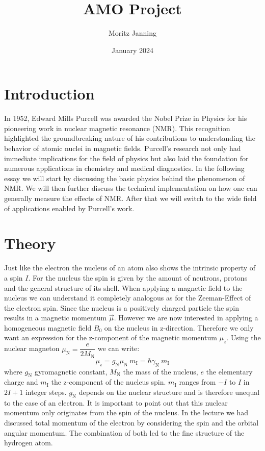 \documentclass{article}
\title{AMO Project}
\author{Moritz Janning}
\date{January 2024}
\begin{document}
\maketitle

\section{Introduction}

In 1952, Edward Mills Purcell was awarded the Nobel Prize in Physics for his pioneering work in nuclear magnetic resonance (NMR). This recognition highlighted the groundbreaking nature of his contributions to understanding the behavior of atomic nuclei in magnetic fields. Purcell's research not only had immediate implications for the field of physics but also laid the foundation for numerous applications in chemistry and medical diagnostics. In the following essay we will start by discussing the basic physics behind the phenomenon of NMR. We will then further discuss the technical implementation on how one can generally measure the effects of NMR. After that we will switch to the wide field of applications enabled by Purcell's work. 

\section{Theory}

Just like the electron the nucleus of an atom also shows the intrinsic property of a spin $I$. For the nucleus the spin is given by the amount of neutrons, protons and the general structure of its shell. When applying a magnetic field to the nucleus we can understand it completely analogous as for the Zeeman-Effect of the electron spin. Since the nucleus is a positively charged particle the spin results in a magnetic momentum $\Vec{\mu}$. However we are now interested in applying a homogeneous magnetic field $B_{\mathrm{0}}$ on the nucleus in z-direction. Therefore we only want an expression for the z-component of the magnetic momentum $\mu_{z}$. Using the nuclear magneton $\mu_{\mathrm{N}}=\dfrac{e}{2M_{\mathrm{N}}}$ we can write:
\begin{equation}
    \mu_{\mathrm{z}}=g_{\mathrm{N}} \mu_{\mathrm{N}}\ m_{\mathrm{I}} =\hbar \gamma_{\mathrm{N}} \ m_{\mathrm{I}}
    \label{eq:magnetic moment}
\end{equation}
where $g_{\mathrm{N}}$ gyromagnetic constant, $M_{\mathrm{N}}$ the mass of the nucleus, $e$ the elementary charge and $m_{\mathrm{I}}$ the z-component of the nucleus spin. $m_{\mathrm{I}}$ ranges from $-I$ to $I$ in $2I+1$ integer steps. $g_{\mathrm{N}}$ depends on the nuclear structure and is therefore unequal to the case of an electron. It is important to point out that this nuclear momentum only originates from the spin of the nucleus. In the lecture we had discussed total momentum of the electron by considering the spin and the orbital angular momentum. The combination of both led to the fine structure of the hydrogen atom.\
\end{document}
